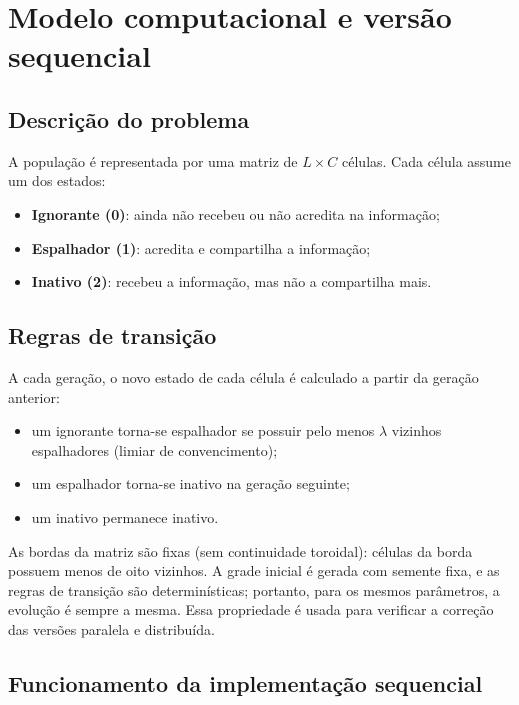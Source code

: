 
\chapter{Modelo computacional e versão sequencial}\label{cap:sequencial}

\section{Descrição do problema}

A população é representada por uma matriz de $L \times C$ células. Cada célula assume um dos estados:

\begin{itemize}
    \item \textbf{Ignorante (0)}: ainda não recebeu ou não acredita na informação;
    \item \textbf{Espalhador (1)}: acredita e compartilha a informação;
    \item \textbf{Inativo (2)}: recebeu a informação, mas não a compartilha mais.
\end{itemize}

\section{Regras de transição}

A cada geração, o novo estado de cada célula é calculado a partir da geração anterior:

\begin{itemize}
    \item um ignorante torna-se espalhador se possuir pelo menos $\lambda$ vizinhos espalhadores (limiar de convencimento);
    \item um espalhador torna-se inativo na geração seguinte;
    \item um inativo permanece inativo.
\end{itemize}

As bordas da matriz são fixas (sem continuidade toroidal): células da borda possuem menos de oito vizinhos. A grade inicial é gerada com semente fixa, e as regras de transição são determinísticas; portanto, para os mesmos parâmetros, a evolução é sempre a mesma. Essa propriedade é usada para verificar a correção das versões paralela e distribuída.

\section{Funcionamento da implementação sequencial}\label{sec:funcionamento-sequencial}

